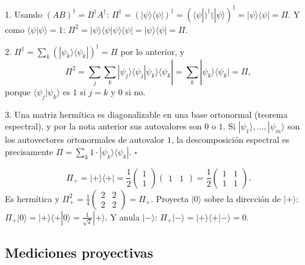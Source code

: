 \documentclass[11pt, a4paper, twoside, openright]{report}
\begin{document}
\begin{tcolorbox}[colback=gray!5!white,colframe=gray!75!black,title=\textbf{Demostración}]
1. Usando $(AB)^\dagger = B^\dagger A^\dagger$: $\Pi^\dagger = (|\psi\rangle\langle\psi|)^\dagger = (\langle\psi|)^\dagger(|\psi\rangle)^\dagger = |\psi\rangle\langle\psi| = \Pi$. Y como $\langle\psi|\psi\rangle = 1$: $\Pi^2 = |\psi\rangle\langle\psi|\psi\rangle\langle\psi| = |\psi\rangle\langle\psi| = \Pi$.

2. $\Pi^\dagger = \sum_k(|\psi_k\rangle\langle\psi_k|)^\dagger = \Pi$ por lo anterior, y
\[ \Pi^2 = \sum_j\sum_k|\psi_j\rangle\langle\psi_j|\psi_k\rangle\langle\psi_k| = \sum_k|\psi_k\rangle\langle\psi_k| = \Pi, \]
porque $\langle\psi_j|\psi_k\rangle$ es $1$ si $j = k$ y $0$ si no.

3. Una matriz hermítica es diagonalizable en una base ortonormal (teorema espectral), y por la nota anterior sus autovalores son $0$ o $1$. Si $|\psi_1\rangle,\dots,|\psi_m\rangle$ son los autovectores ortonormales de autovalor $1$, la descomposición espectral es precisamente $\Pi = \sum_k 1\cdot|\psi_k\rangle\langle\psi_k|$. \hfill $\square$
\end{tcolorbox}

\begin{tcolorbox}[colback=cyan!5!white,colframe=cyan!75!black,title=\textbf{Ejemplo: La proyección sobre $|+\rangle$}]
\[ \Pi_+ = |+\rangle\langle+| = \frac12\begin{pmatrix}1\\1\end{pmatrix}\begin{pmatrix}1&1\end{pmatrix} = \frac12\begin{pmatrix}1&1\\1&1\end{pmatrix}. \]
Es hermítica y $\Pi_+^2 = \frac14\begin{pmatrix}2&2\\2&2\end{pmatrix} = \Pi_+$. Proyecta $|0\rangle$ sobre la dirección de $|+\rangle$: $\Pi_+|0\rangle = |+\rangle\langle+|0\rangle = \frac{1}{\sqrt2}|+\rangle$. Y anula $|-\rangle$: $\Pi_+|-\rangle = |+\rangle\langle+|-\rangle = 0$.
\end{tcolorbox}

\subsection{Mediciones proyectivas}
\end{document}
